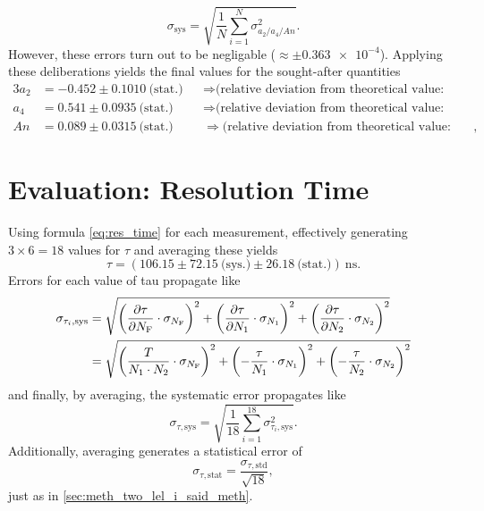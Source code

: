 \begin{equation*}
	\sigma_\text{sys} = \sqrt{\frac{1}{N}\sum_{i=1}^N\sigma_\text{$a_2/a_4/An$}^2}.
\end{equation*}
However, these errors turn out to be negligable ($\approx\pm\num{0.363e-4}$).
Applying these deliberations yields the final values for the sought-after quantities
\begin{alignat*}{3}
 a_2 &= \num{-0.452}\pm\num{0.1010}\ \text{(stat.)} &&\Rightarrow \text{(relative deviation from theoretical value: 461.48\%)}\\
 a_4 &= \num{0.541}\pm\num{0.0935}\ \text{(stat.)}  &&\Rightarrow \text{(relative deviation from theoretical value: 1197.27\%)} \\
 An  &= \num{0.089}\pm\num{0.0315}\ \text{(stat.)}   &&\Rightarrow \text{(relative deviation from theoretical value: 46.90\%)},
\end{alignat*}

\section{Evaluation: Resolution Time}
Using formula \ref{eq:res_time} for each measurement, effectively generating $3\times 6 = 18$ values for $\tau$ and averaging these yields
\begin{equation*}
	\tau = (\num{106.15}\pm\num{72.15}\ \text{(sys.)}\pm \num{26.18}\ \text{(stat.)})\ \si{\ns}.
\end{equation*}
Errors for each value of tau propagate like
\begin{align*}
	\sigma_{\tau_i,\text{sys}} &= \sqrt{\left(\frac{\partial \tau}{\partial N_\text{F}}\cdot\sigma_{N_\text{F}}\right)^2 + \left(\frac{\partial \tau}{\partial N_1}\cdot\sigma_{N_1}\right)^2 + \left(\frac{\partial \tau}{\partial N_2}\cdot\sigma_{N_2}\right)^2} \\
	&= \sqrt{ \left(\frac{T}{N_1\cdot N_2}\cdot\sigma_{N_\text{F}}\right)^2 + \left(-\frac{\tau}{N_1}\cdot\sigma_{N_1}\right)^2 + \left(-\frac{\tau}{N_2}\cdot\sigma_{N_2}\right)^2}
\end{align*}
and finally, by averaging, the systematic error propagates like
\begin{equation*}
	\sigma_{\tau,\text{sys}} = \sqrt{\frac{1}{18}\sum_{i=1}^{18}\sigma_{\tau_i,\text{sys}}^2}.
\end{equation*}
Additionally, averaging generates a statistical error of
\begin{equation*}
	\sigma_{\tau,\text{stat}} = \frac{\sigma_{\tau,\text{std}}}{\sqrt{18}},
\end{equation*}
just as in \autoref{sec:meth_two_lel_i_said_meth}.
